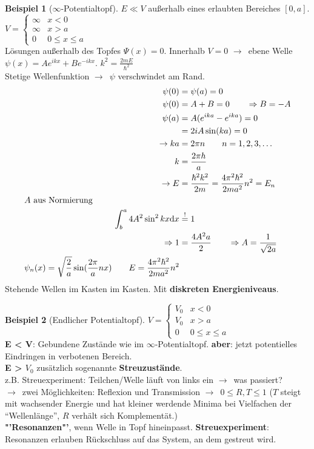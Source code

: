 \documentclass[oneside]{book}
\theoremstyle{definition}
\newtheorem*{beispiel*}{Beispiel}
\newcommand{\conseq}{$\rightarrow$~}
\renewcommand{\d}{\mathrm d}
\begin{document}
\begin{beispiel*}[$\infty$-Potentialtopf]
	$E \ll V$ außerhalb eines erlaubten Bereiches $[0, a]$.\\
	$V = \begin{cases}
	\infty & x < 0\\
	\infty & x > a\\
	0 & 0 \le x \le a
	\end{cases}$\\
	Lösungen außerhalb des Topfes $\Psi(x) = 0$. Innerhalb $V = 0$ \conseq ebene Welle $\psi(x) = A e^{ikx} + Be^{-ikx}$. $k^2 = \frac{2mE}{\hbar^2}$\\
	Stetige Wellenfunktion \conseq $\psi$ verschwindet am Rand.
	\begin{align*}
		\psi(0) &=\psi(a) = 0\\
		\psi(0) &= A + B = 0 \qquad \Rightarrow B = -A\\
		\psi(a) &= A(e^{ika} - e^{ika}) = 0\\
		&= 2iA \sin(ka) = 0\\
		\rightarrow ka &= 2\pi n \qquad n = 1, 2, 3, \dots\\
		k &= \frac{2\pi h}{a}\\
		\rightarrow E &= \frac{\hbar^2 k^2}{2 m} = \frac{4 \pi^2 \hbar^2}{2 m a^2} n^2 = E_n\\
		\intertext{$A$ aus Normierung}
		\int_b^a 4 A^2 \sin^2 kx \d x &\overset!= 1\\
		\Rightarrow 1 &= \frac{4A^2a}{2} \qquad \Rightarrow A = \frac{1}{\sqrt{2a}}\\
		\psi_n(x) = \sqrt{\frac2a} \sin(\frac{2\pi}{a} n x) \qquad E = \frac{4 \pi^2 \hbar^2}{2ma^2} n^2
	\end{align*}
	Stehende Wellen im Kasten im Kasten. Mit \textbf{diskreten Energieniveaus}.
\end{beispiel*}

\begin{beispiel*}[Endlicher Potentialtopf]
	$V = \begin{cases}
	V_0 & x < 0\\
	V_0 & x > a\\
	0 & 0 \le x \le a
	\end{cases}$\\
	\textbf{E < V}: Gebundene Zustände wie im $\infty$-Potentialtopf. \textbf{aber}: jetzt potentielles Eindringen in verbotenen Bereich.\\
	\textbf{E > $V_0$} zusätzlich sogenannte \textbf{Streuzustände}.\\
	z.B. Streuexperiment: Teilchen/Welle läuft von links ein \conseq was passiert?\\
	\conseq zwei Möglichkeiten: Reflexion und Transmission
	\conseq $0 \le R, T \le 1$ ($T$ steigt mit wachsender Energie und hat kleiner werdende Minima bei Vielfachen der "`Wellenlänge"', $R$ verhält sich Komplementät.)\\
	\textbf{"'Resonanzen"'}, wenn Welle in Topf hineinpasst. \textbf{Streuexperiment}: Resonanzen erlauben Rückschluss auf das System, an dem gestreut wird.
\end{beispiel*}
\end{document}
